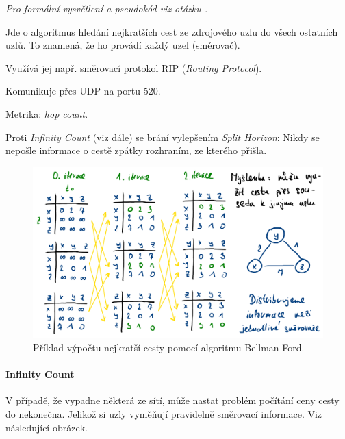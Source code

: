 \begin{compactitem}
    \item \textit{Pro formální vysvětlení a pseudokód viz otázku .}
    \item Jde o algoritmus hledání nejkratších cest ze zdrojového uzlu do všech ostatních uzlů. To znamená, že ho provádí každý uzel (směrovač).
    \item Využívá jej např. směrovací protokol RIP (\textit{Routing Protocol}). \begin{compactitem}
        \item Komunikuje přes UDP na portu 520.
        \item Metrika: \textit{hop count}.
        \item Proti \textit{Infinity Count} (viz dále) se brání vylepšením \textit{Split Horizon}: Nikdy se nepošle informace o cestě zpátky rozhraním, ze kterého přišla.
    \end{compactitem}
\end{compactitem}

\begin{figure}[H]
    \centering
    \includegraphics[width=1\linewidth]{bellman_ford_example.pdf}
    \caption{Příklad výpočtu nejkratší cesty pomocí algoritmu Bellman-Ford.}
\end{figure}

\paragraph*{Infinity Count} V případě, že vypadne některá ze sítí, může nastat problém počítání ceny cesty do nekonečna. Jelikož si uzly vyměňují pravidelně směrovací informace. Viz následující obrázek.


